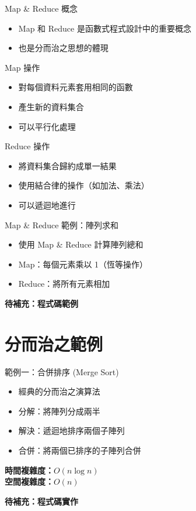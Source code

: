 \documentclass{beamer}
\begin{document}
\begin{frame}{Map \& Reduce 概念}
\begin{itemize}
    \item Map 和 Reduce 是函數式程式設計中的重要概念
    \item 也是分而治之思想的體現
\end{itemize}

\vspace{1em}
\begin{block}{Map 操作}
\begin{itemize}
    \item 對每個資料元素套用相同的函數
    \item 產生新的資料集合
    \item 可以平行化處理
\end{itemize}
\end{block}

\vspace{0.5em}
\begin{block}{Reduce 操作}
\begin{itemize}
    \item 將資料集合歸約成單一結果
    \item 使用結合律的操作（如加法、乘法）
    \item 可以遞迴地進行
\end{itemize}
\end{block}
\end{frame}

\begin{frame}{Map \& Reduce 範例：陣列求和}
\begin{itemize}
    \item 使用 Map \& Reduce 計算陣列總和
    \item Map：每個元素乘以 1（恆等操作）
    \item Reduce：將所有元素相加
\end{itemize}

\vspace{1em}
\textbf{待補充：程式碼範例}
\end{frame}

\section{分而治之範例}

\begin{frame}{範例一：合併排序 (Merge Sort)}
\begin{itemize}
    \item 經典的分而治之演算法
    \item 分解：將陣列分成兩半
    \item 解決：遞迴地排序兩個子陣列
    \item 合併：將兩個已排序的子陣列合併
\end{itemize}

\vspace{1em}
\textbf{時間複雜度：}$O(n \log n)$\\
\textbf{空間複雜度：}$O(n)$

\vspace{1em}
\textbf{待補充：程式碼實作}
\end{frame}
\end{document}
